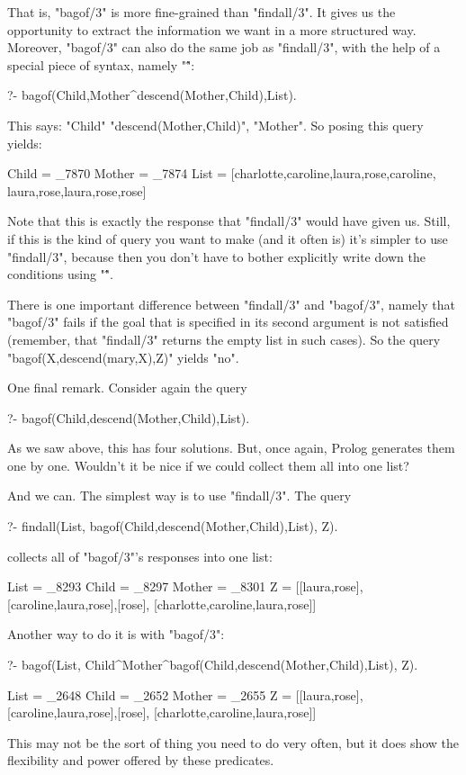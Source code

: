 That is, "bagof/3" is more fine-grained than "findall/3". It gives us the
opportunity to extract the information we want in a more structured
way.  Moreover, "bagof/3" can also do the same job as "findall/3", with the
help of a special piece of syntax, namely "\^":
\begin{LPNcodedisplay}
?- bagof(Child,Mother^descend(Mother,Child),List).
\end{LPNcodedisplay}
This says:  "Child"
 "descend(Mother,Child)",  "Mother".  So posing this query yields:
\begin{LPNcodedisplay}
Child = _7870
Mother = _7874
List = [charlotte,caroline,laura,rose,caroline,
        laura,rose,laura,rose,rose]
\end{LPNcodedisplay}
Note that this is exactly the response that "findall/3" would have
given us. Still, if this is the
kind of query you want to make (and it often is) it's simpler to use
"findall/3", because then you don't have to bother explicitly write
down the conditions using "\^".

There is one important difference between "findall/3"
and "bagof/3", namely that "bagof/3" fails if the
goal that is specified in its second argument is not satisfied
(remember, that "findall/3" returns the empty list in such
cases). So the query
"bagof(X,descend(mary,X),Z)" yields "no".

One final remark. Consider again the query
\begin{LPNcodedisplay}
?- bagof(Child,descend(Mother,Child),List).
\end{LPNcodedisplay}
As we saw above, this has four solutions. But, once again, Prolog
generates them one by one. Wouldn't it be nice if
we could collect them all into one list?

And we can. The simplest way is to use "findall/3".  The query
\begin{LPNcodedisplay}
?- findall(List,
           bagof(Child,descend(Mother,Child),List),
           Z).
\end{LPNcodedisplay}
collects all of "bagof/3"'s responses into one list:
\begin{LPNcodedisplay}
List = _8293
Child = _8297
Mother = _8301
Z = [[laura,rose],[caroline,laura,rose],[rose],
                  [charlotte,caroline,laura,rose]]
\end{LPNcodedisplay}
Another way to do it is with "bagof/3":
\begin{LPNcodedisplay}
?- bagof(List,
   Child^Mother^bagof(Child,descend(Mother,Child),List),
   Z).

List = _2648
Child = _2652
Mother = _2655
Z = [[laura,rose],[caroline,laura,rose],[rose],
                  [charlotte,caroline,laura,rose]]
\end{LPNcodedisplay}
This may not be the sort of thing you need to do very often, but
it does show the flexibility and power offered by these predicates.




